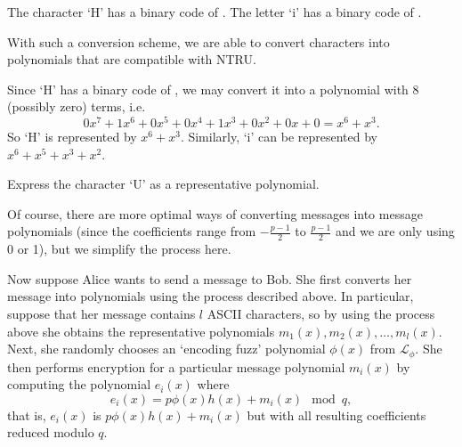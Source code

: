 \begin{example}
    The character `H' has a binary code of . The letter `i' has a binary code of .
\end{example}

With such a conversion scheme, we are able to convert characters into polynomials that are compatible with NTRU.

\begin{example}
    Since `H' has a binary code of , we may convert it into a polynomial with 8 (possibly zero) terms, i.e.
    \[
        0x^7 + 1x^6 + 0x^5 + 0x^4 + 1x^3 + 0x^2 + 0x + 0 = x^6 + x^3.
    \]
    So `H' is represented by $x^6 + x^3$. Similarly, `i' can be represented by $x^6 + x^5 + x^3 + x^2$.
\end{example}

\begin{exercise}
    Express the character `U' as a representative polynomial.
\end{exercise}

Of course, there are more optimal ways of converting messages into message polynomials (since the coefficients range from $-\frac{p-1}2$ to $\frac{p-1}2$ and we are only using 0 or 1), but we simplify the process here.

Now suppose Alice wants to send a message to Bob. She first converts her message into polynomials using the process described above. In particular, suppose that her message contains $l$ ASCII characters, so by using the process above she obtains the representative polynomials $m_1(x), m_2(x), \dots, m_l(x)$. Next, she randomly chooses an `encoding fuzz' polynomial $\phi(x)$ from $\mathcal{L}_\phi$. She then performs encryption for a particular message polynomial $m_i(x)$ by computing the polynomial $e_i(x)$ where
\[
    e_i(x) = p\phi(x)h(x) + m_i(x) \mod q,
\]
that is, $e_i(x)$ is $p\phi(x)h(x) + m_i(x)$ but with all resulting coefficients reduced modulo $q$.

